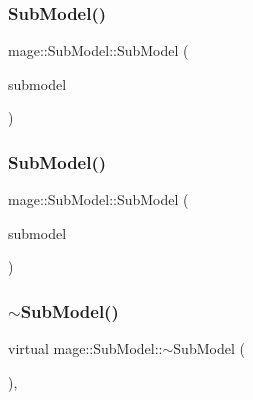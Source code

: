 \hypertarget{classmage_1_1_sub_model_ae71dcb72fc1b06710b390c97a2db1d68}{}\label{classmage_1_1_sub_model_ae71dcb72fc1b06710b390c97a2db1d68} 
\subsubsection{\texorpdfstring{Sub\+Model()}{SubModel()}\hspace{0.1cm}{\footnotesize\ttfamily [2/3]}}
{\footnotesize\ttfamily mage\+::\+Sub\+Model\+::\+Sub\+Model (\begin{DoxyParamCaption}\item[{const \hyperlink{classmage_1_1_sub_model}{Sub\+Model} \&}]{submodel }\end{DoxyParamCaption})}

\hypertarget{classmage_1_1_sub_model_a6b4b972e0740af607113aae0418e370e}{}\label{classmage_1_1_sub_model_a6b4b972e0740af607113aae0418e370e} 
\subsubsection{\texorpdfstring{Sub\+Model()}{SubModel()}\hspace{0.1cm}{\footnotesize\ttfamily [3/3]}}
{\footnotesize\ttfamily mage\+::\+Sub\+Model\+::\+Sub\+Model (\begin{DoxyParamCaption}\item[{\hyperlink{classmage_1_1_sub_model}{Sub\+Model} \&\&}]{submodel }\end{DoxyParamCaption})\hspace{0.3cm}{\ttfamily [default]}}

\hypertarget{classmage_1_1_sub_model_a75853fd4a6435f074f13eab9c73b695b}{}\label{classmage_1_1_sub_model_a75853fd4a6435f074f13eab9c73b695b} 
\subsubsection{\texorpdfstring{$\sim$\+Sub\+Model()}{~SubModel()}}
{\footnotesize\ttfamily virtual mage\+::\+Sub\+Model\+::$\sim$\+Sub\+Model (\begin{DoxyParamCaption}{ }\end{DoxyParamCaption})\hspace{0.3cm}{\ttfamily [virtual]}, {\ttfamily [default]}}




